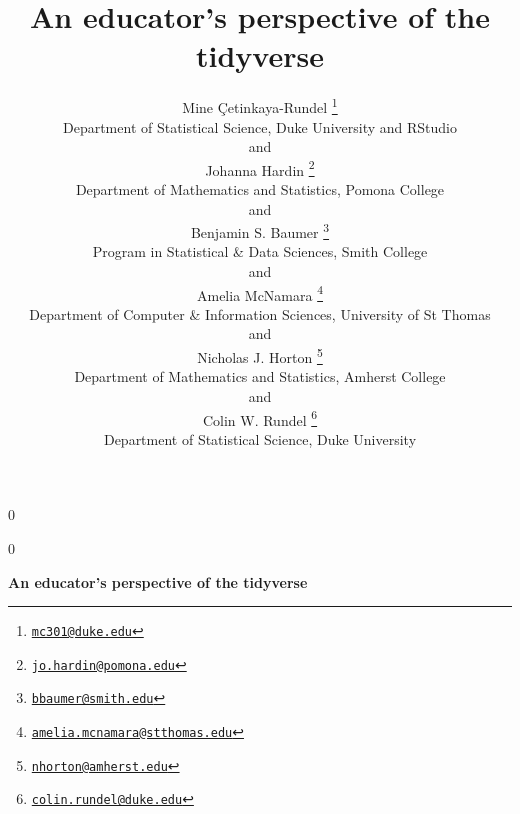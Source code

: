 \documentclass[12pt]{article}
\newcommand{\blind}{0}
\begin{document}
\def\spacingset#1{\renewcommand{\baselinestretch}%
{#1}\small\normalsize} \spacingset{1}



\blind
{
  \title{\bf An educator's perspective of the tidyverse}

  \author{
        Mine \c{C}etinkaya-Rundel \footnote{\href{mailto:mc301@duke.edu}{\nolinkurl{mc301@duke.edu}}} \\
    Department of Statistical Science, Duke University and RStudio\\
     and \\     Johanna Hardin \footnote{\href{mailto:jo.hardin@pomona.edu}{\nolinkurl{jo.hardin@pomona.edu}}} \\
    Department of Mathematics and Statistics, Pomona College\\
     and \\     Benjamin S. Baumer \footnote{\href{mailto:bbaumer@smith.edu}{\nolinkurl{bbaumer@smith.edu}}} \\
    Program in Statistical \& Data Sciences, Smith College\\
     and \\     Amelia McNamara \footnote{\href{mailto:amelia.mcnamara@stthomas.edu}{\nolinkurl{amelia.mcnamara@stthomas.edu}}} \\
    Department of Computer \& Information Sciences, University of St
Thomas\\
     and \\     Nicholas J. Horton \footnote{\href{mailto:nhorton@amherst.edu}{\nolinkurl{nhorton@amherst.edu}}} \\
    Department of Mathematics and Statistics, Amherst College\\
     and \\     Colin W. Rundel \footnote{\href{mailto:colin.rundel@duke.edu}{\nolinkurl{colin.rundel@duke.edu}}} \\
    Department of Statistical Science, Duke University\\
      }
  \maketitle
} \fi

\blind
{
  \bigskip
  \bigskip
  \bigskip
  \begin{center}
    {\LARGE\bf An educator's perspective of the tidyverse}
  \end{center}
  \medskip
} \fi
\end{document}
